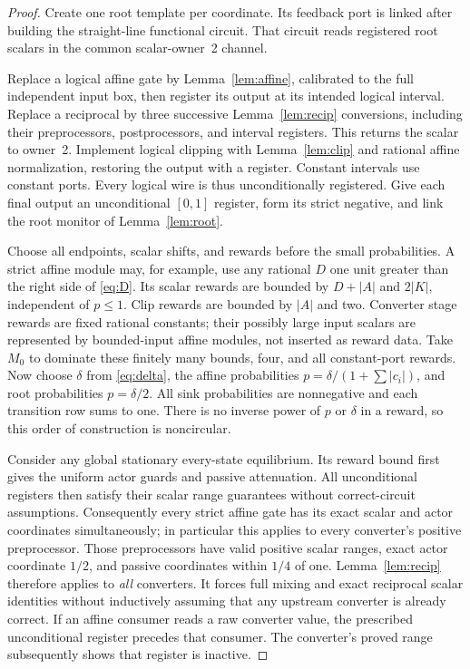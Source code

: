 \documentclass[11pt,a4paper]{article}
\numberwithin{equation}{section}
\theoremstyle{definition}
\begin{document}
\begin{proof}
Create one root template per coordinate. Its feedback port is linked
after building the straight-line functional circuit. That circuit reads
registered root scalars in the common scalar-owner~2 channel.

Replace a logical affine gate by Lemma~\ref{lem:affine}, calibrated to
the full independent input box, then register its output at its intended
logical interval. Replace a reciprocal by three successive
Lemma~\ref{lem:recip} conversions, including their preprocessors,
postprocessors, and interval registers. This returns the scalar to
owner~2. Implement logical clipping with Lemma~\ref{lem:clip} and
rational affine normalization, restoring the output with a register.
Constant intervals use constant ports. Every logical wire is thus
unconditionally registered. Give each final output an unconditional
\([0,1]\) register, form its strict negative, and link the root
monitor of Lemma~\ref{lem:root}.

Choose all endpoints, scalar shifts, and rewards before the small
probabilities. A strict affine module may, for example, use any
rational \(D\) one unit greater than the right side of \eqref{eq:D}.
Its scalar rewards are bounded by \(D+|A|\) and \(2|K|\), independent
of \(p\leq1\). Clip rewards are bounded by \(|A|\) and two.
Converter stage rewards are fixed rational constants; their possibly
large input scalars are represented by bounded-input affine modules,
not inserted as reward data. Take \(M_0\) to dominate these finitely
many bounds, four, and all constant-port rewards. Now choose
\(\delta\) from \eqref{eq:delta}, the affine probabilities
\(p=\delta/(1+\sum|c_i|)\), and root probabilities
\(p=\delta/2\). All sink probabilities are nonnegative and each
transition row sums to one. There is no inverse power of \(p\) or
\(\delta\) in a reward, so this order of construction is noncircular.

Consider any global stationary every-state equilibrium. Its reward
bound first gives the uniform actor guards and passive attenuation.
All unconditional registers then satisfy their scalar range guarantees
without correct-circuit assumptions. Consequently every strict affine
gate has its exact scalar and actor coordinates simultaneously; in
particular this applies to every converter's positive preprocessor.
Those preprocessors have valid positive scalar ranges, exact actor
coordinate \(1/2\), and passive coordinates within \(1/4\) of one.
Lemma~\ref{lem:recip} therefore applies to \emph{all} converters.
It forces full mixing and exact reciprocal scalar identities without
inductively assuming that any upstream converter is already correct.
If an affine consumer reads a raw converter value, the prescribed
unconditional register precedes that consumer. The converter's proved
range subsequently shows that register is inactive.


\end{proof}
\end{document}
